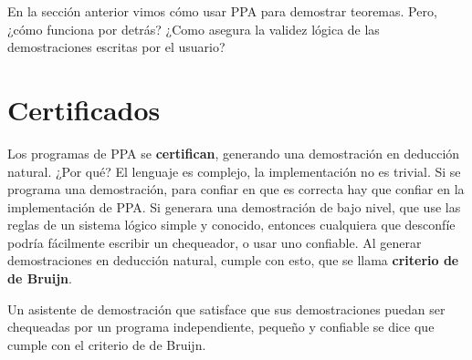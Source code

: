 
En la sección anterior vimos cómo usar PPA para demostrar teoremas. Pero, ¿cómo
funciona por detrás? ¿Como asegura la validez lógica de las demostraciones
escritas por el usuario?

\section{Certificados}

Los programas de PPA se \textbf{certifican}, generando una demostración en
deducción natural. ¿Por qué? El lenguaje es complejo, la implementación no es
trivial. Si se programa una demostración, para confiar en que es correcta hay
que confiar en la implementación de PPA. Si generara una demostración de bajo
nivel, que use las reglas de un sistema lógico simple y conocido, entonces
cualquiera que desconfíe podría fácilmente escribir un chequeador, o usar uno
confiable. Al generar demostraciones en deducción natural, cumple con esto, que se llama \textbf{criterio de de Bruijn}.

\begin{definition} Un asistente de
    demostración que satisface que sus demostraciones puedan ser chequeadas por
    un programa independiente, pequeño y confiable se dice que cumple con el
    criterio de de Bruijn.
\end{definition}

